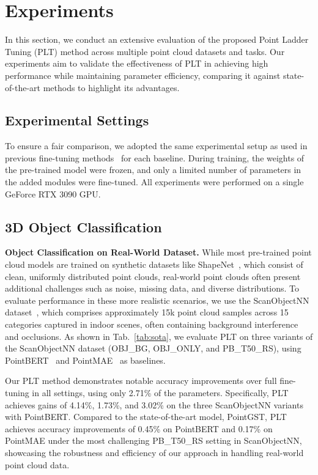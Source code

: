 

\section{Experiments}
\label{sec:experiments}
In this section, we conduct an extensive evaluation of the proposed Point Ladder Tuning (PLT) method across multiple point cloud datasets and tasks. Our experiments aim to validate the effectiveness of PLT in achieving high performance while maintaining parameter efficiency, comparing it against state-of-the-art methods to highlight its advantages.
\subsection{Experimental Settings}
To ensure a fair comparison, we adopted the same experimental setup as used in previous fine-tuning methods~\cite{zha2023instance, zhou2024dynamic} for each baseline. During training, the weights of the pre-trained model were frozen, and only a limited number of parameters in the added modules were fine-tuned. All experiments were performed on a single GeForce RTX 3090 GPU.

\subsection{3D Object Classification}
\label{sec:classification}
\textbf{Object Classification on Real-World Dataset.} While most pre-trained point cloud models are trained on synthetic datasets like ShapeNet~\cite{chang2015shapenet}, which consist of clean, uniformly distributed point clouds, real-world point clouds often present additional challenges such as noise, missing data, and diverse distributions. To evaluate performance in these more realistic scenarios, we use the ScanObjectNN dataset~\cite{uy2019revisiting}, which comprises approximately 15k point cloud samples across 15 categories captured in indoor scenes, often containing background interference and occlusions. As shown in Tab.~\ref{tab:sota}, we evaluate PLT on three variants of the ScanObjectNN dataset (OBJ\_BG, OBJ\_ONLY, and PB\_T50\_RS), using PointBERT~\cite{yu2022point} and PointMAE~\cite{pang2022masked} as baselines.

Our PLT method demonstrates notable accuracy improvements over full fine-tuning in all settings, using only 2.71\% of the parameters. Specifically, PLT achieves gains of 4.14\%, 1.73\%, and 3.02\% on the three ScanObjectNN variants with PointBERT. Compared to the state-of-the-art model, PointGST, PLT achieves accuracy improvements of 0.45\% on PointBERT and 0.17\% on PointMAE under the most challenging PB\_T50\_RS setting in ScanObjectNN, showcasing the robustness and efficiency of our approach in handling real-world point cloud data.



